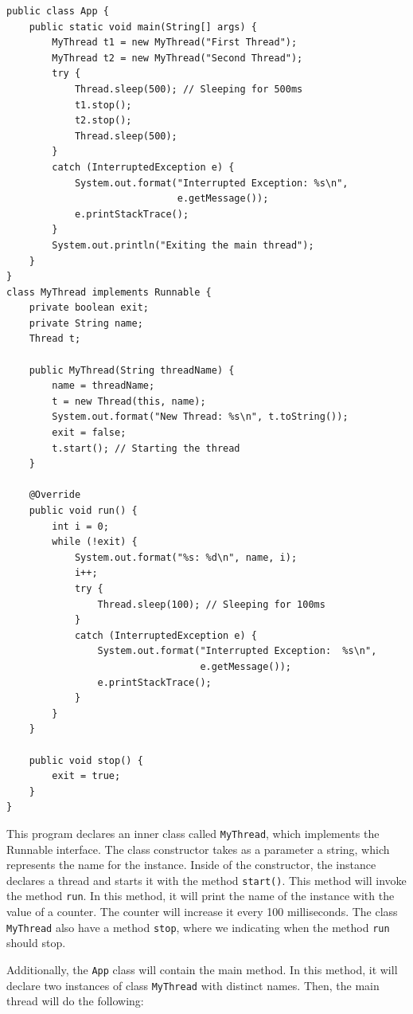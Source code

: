 \documentclass{latex/classes/thesis}
\begin{document}
\begin{lstlisting}
public class App {
    public static void main(String[] args) {
        MyThread t1 = new MyThread("First Thread");
        MyThread t2 = new MyThread("Second Thread");
        try {
            Thread.sleep(500); // Sleeping for 500ms
            t1.stop();
            t2.stop();
            Thread.sleep(500);
        }
        catch (InterruptedException e) {
            System.out.format("Interrupted Exception: %s\n",
                              e.getMessage());
            e.printStackTrace();
        }
        System.out.println("Exiting the main thread");
    }
}
class MyThread implements Runnable {
    private boolean exit;
    private String name;
    Thread t;

    public MyThread(String threadName) {
        name = threadName;
        t = new Thread(this, name);
        System.out.format("New Thread: %s\n", t.toString());
        exit = false;
        t.start(); // Starting the thread
    }

    @Override
    public void run() {
        int i = 0;
        while (!exit) {
            System.out.format("%s: %d\n", name, i);
            i++;
            try {
                Thread.sleep(100); // Sleeping for 100ms
            }
            catch (InterruptedException e) {
                System.out.format("Interrupted Exception:  %s\n",
                                  e.getMessage());
                e.printStackTrace();
            }
        }
    }

    public void stop() {
        exit = true;
    }
}
\end{lstlisting}

This program declares an inner class called \texttt{MyThread}, which implements the
Runnable interface. The class constructor takes as a parameter a string,
which represents the name for the instance. Inside of the constructor, the
instance declares a thread and starts it with the method \texttt{start()}. This
method will invoke the method \texttt{run}. In this method, it will print the name of
the instance with the value of a counter. The counter will increase it every
100 milliseconds. The class \texttt{MyThread} also have a method \texttt{stop}, where we
indicating when the method \texttt{run} should stop.

Additionally, the \texttt{App} class will contain the main method. In this method, it
will declare two instances of class \texttt{MyThread} with distinct names. Then, the
main thread will do the following:
\end{document}
